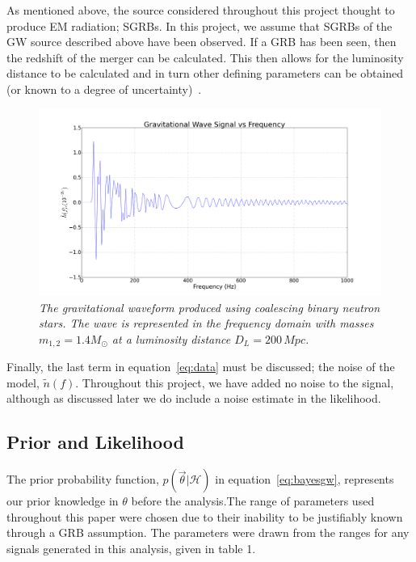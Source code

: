 \documentclass{jpconf}
\newcommand{\curlH}{\mathcal{H}}
\begin{document}
As mentioned above, the source considered throughout this project thought to produce EM radiation; SGRBs. In this project, we assume that SGRBs of the GW source described above have been observed. If a GRB has been seen, then the redshift of the merger can be calculated. This then allows for the luminosity distance to be calculated and in turn other defining parameters can be obtained (or known to a degree of uncertainty)~\cite{SathSchutz}.  



\begin{figure}[h]
  \centering
  \includegraphics[width=\textwidth]{grav_signal}
  \caption{\textit{The gravitational waveform produced using coalescing binary neutron stars. The wave is represented in the frequency domain with masses $m_{1,2} = 1.4M_{\odot}$ at a luminosity distance $D_{L} = 200 \,Mpc$.}}
  \captionsetup{justification=centering}
  \label{fig:signal}
\end{figure}

Finally, the last term in equation~\ref{eq:data} must be discussed; the noise of the model, $\tilde{n}(f)$. Throughout this project, we have added no noise to the signal, although as discussed later we do include a noise estimate in the likelihood.



\subsection{Prior and Likelihood}
\label{sec:pandl}

The prior probability function, $p(\vec{\theta} | \curlH)$ in equation~\ref{eq:bayesgw}, represents our prior knowledge in $\theta$ before the analysis.The range of parameters used throughout this paper were chosen due to their inability to be justifiably known through a GRB assumption. The parameters were drawn from the ranges for any signals generated in this analysis, given in table 1. 
\end{document}
